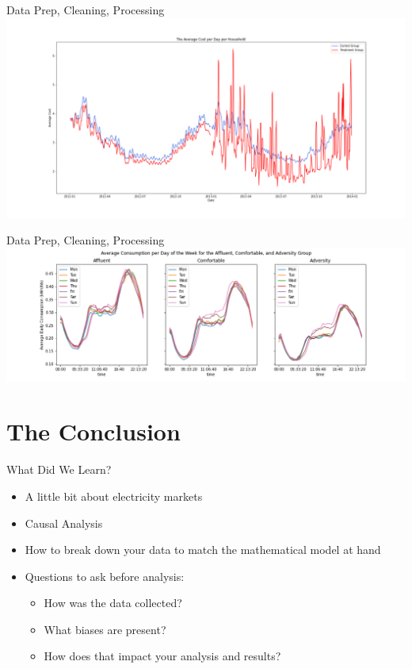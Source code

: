 \documentclass{beamer}
\begin{document}
\begin{frame}{Data Prep, Cleaning, Processing}
  \centering
  \includegraphics[width=1\textwidth]{images/avg-cost-per-day.png}
\end{frame}

\begin{frame}{Data Prep, Cleaning, Processing}
  \centering
  \includegraphics[width=1.1\textwidth]{images/dow-socio.png}
\end{frame}

\section{The Conclusion}

\begin{frame}{What Did We Learn?}
  \begin{itemize}
    \item<+-> A little bit about electricity markets
    \item<+-> Causal Analysis
    \item<+-> How to break down your data to match the mathematical model at hand
    \item<+-> Questions to ask before analysis:
    \begin{itemize}
      \item<+-> How was the data collected? 
      \item<+-> What biases are present?
      \item<+-> How does that impact your analysis and results?
    \end{itemize}
  \end{itemize}
\end{frame}
\end{document}
